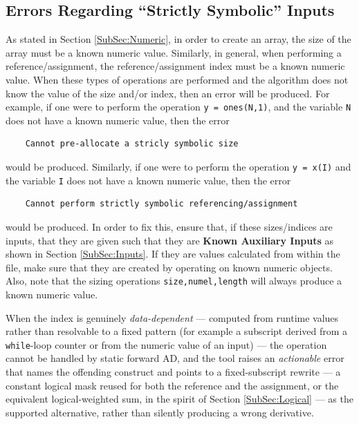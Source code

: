\documentclass[10pt,pdftex]{article}
\begin{document}
\subsection{Errors Regarding ``Strictly Symbolic'' Inputs}
As stated in Section \ref{SubSec:Numeric}, in order to create an array, the size of the array must be a known numeric value. Similarly, in general, when performing a reference/assignment, the reference/assignment index must be a known numeric value. When these types of operations are performed and the algorithm does not know the value of the size and/or index, then an error will be produced. For example, if one were to perform the operation \texttt{y = ones(N,1)}, and the variable \texttt{N} does not have a known numeric value, then the error
\begin{verbatim}
    Cannot pre-allocate a stricly symbolic size
\end{verbatim}
would be produced. Similarly, if one were to perform the operation \texttt{y = x(I)} and the variable \texttt{I} does not have a known numeric value, then the error
\begin{verbatim}
    Cannot perform strictly symbolic referencing/assignment
\end{verbatim}
would be produced. In order to fix this, ensure that, if these sizes/indices are inputs, that they are given such that they are {\bf Known Auxiliary Inputs} as shown in Section \ref{SubSec:Inputs}. If they are values calculated from within the file, make sure that they are created by operating on known numeric objects. Also, note that the sizing operations \texttt{size,numel,length} will always produce a known numeric value.

When the index is genuinely {\em data-dependent} --- computed from runtime values rather than resolvable to a fixed pattern (for example a subscript derived from a \texttt{while}-loop counter or from the numeric value of an input) --- the operation cannot be handled by static forward AD, and the tool raises an {\em actionable} error that names the offending construct and points to a fixed-subscript rewrite --- a constant logical mask reused for both the reference and the assignment, or the equivalent logical-weighted sum, in the spirit of Section \ref{SubSec:Logical} --- as the supported alternative, rather than silently producing a wrong derivative.
\end{document}
